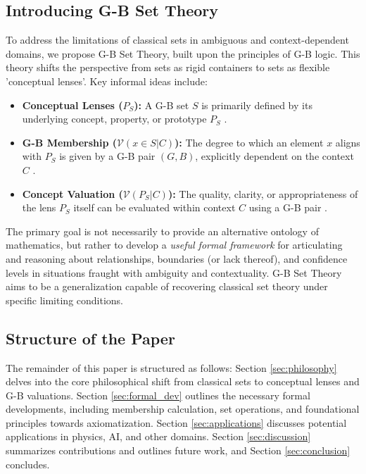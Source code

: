 \documentclass[11pt]{article}
\newcommand{\gbval}[1]{\mathcal{V}(#1)}         %
\newcommand{\pset}[1]{P_{#1}}                   %
\theoremstyle{definition}
\theoremstyle{plain}
\begin{document}
\subsection{Introducing G-B Set Theory}
To address the limitations of classical sets in ambiguous and context-dependent domains, we propose G-B Set Theory, built upon the principles of G-B logic. This theory shifts the perspective from sets as rigid containers to sets as flexible 'conceptual lenses'. Key informal ideas include:
\begin{itemize}
    \item \textbf{Conceptual Lenses ($\pset{S}$):} A G-B set $S$ is primarily defined by its underlying concept, property, or prototype $\pset{S}$ \cite{gb_set_theory_outline}.
    \item \textbf{G-B Membership ($\gbval{x \in S|C}$):} The degree to which an element $x$ aligns with $\pset{S}$ is given by a G-B pair $(G, B)$, explicitly dependent on the context $C$ \cite{gb_set_theory_outline}.
    \item \textbf{Concept Valuation ($\gbval{\pset{S}|C}$):} The quality, clarity, or appropriateness of the lens $\pset{S}$ itself can be evaluated within context $C$ using a G-B pair \cite{gb_set_theory_outline}.
\end{itemize}
The primary goal is not necessarily to provide an alternative ontology of mathematics, but rather to develop a \textit{useful formal framework} for articulating and reasoning about relationships, boundaries (or lack thereof), and confidence levels in situations fraught with ambiguity and contextuality. G-B Set Theory aims to be a generalization capable of recovering classical set theory under specific limiting conditions.

\subsection{Structure of the Paper}
The remainder of this paper is structured as follows: Section \ref{sec:philosophy} delves into the core philosophical shift from classical sets to conceptual lenses and G-B valuations. Section \ref{sec:formal_dev} outlines the necessary formal developments, including membership calculation, set operations, and foundational principles towards axiomatization. Section \ref{sec:applications} discusses potential applications in physics, AI, and other domains. Section \ref{sec:discussion} summarizes contributions and outlines future work, and Section \ref{sec:conclusion} concludes.
\end{document}
